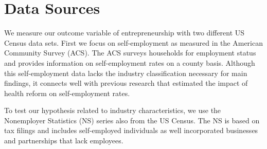 \documentclass[12pt]{article}
\begin{document}
\begin{comment}

Our last proposition describes the relative short and long term affect of a health care shock. 

\textbf{Proposition 4:} The relative increase in low versus high capital firms should attenuate over time. 

\textbf{Proof:} See Appendix A for a formal statement and proof

This follows from entrepreneurs having any memory of past opportunities. Immediately after the shock, opportunities in Figure \ref{fig:ideaSpace}'s striped region that occurred to the entrepreneur in the current time period as well as prior periods become feasible. In future periods, feasible opportunities are only drawn from the new ideas generated by the entrepreneur that period.

\end{comment}

\section{Data Sources}
\label{sec:data}


We measure our outcome variable of entrepreneurship with two different US Census data sets. First we focus on self-employment as measured in the American Community Survey (ACS). The ACS surveys households for employment status and provides information on self-employment rates on a county basis. Although this self-employment data lacks the industry classification necessary for main findings, it connects well with previous research that estimated the impact of health reform on self-employment rates. 

To test our hypothesis related to industry characteristics, we use the Nonemployer Statistics (NS) series also from the US Census. The NS is based on tax filings and includes self-employed individuals as well incorporated businesses and partnerships that lack employees. 
\end{document}

